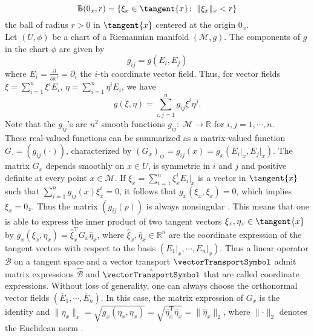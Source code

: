 \begin{equation*}
    \mathbb{B}(0_x, r) = \{ \xi_x \in \tangent{x} \colon \; \lVert \xi_x \rVert_x < r \}
\end{equation*}
the ball of radius $r > 0$ in $\tangent{x}$ centered at the origin $0_x$. \\
Let $(U, \phi)$ be a chart of a Riemannian manifold $(\mathcal{M},g)$. The components of $g$ in the chart $\phi$ are given by
\begin{equation*}
    g_{ij} = g(E_i, E_j)
\end{equation*}
where $E_i = \frac{\partial}{\partial x^i}= \partial_i$ the $i$-th coordinate vector field. Thus, for vector fields $\xi = \sum^{n}_{i=1} \xi^i E_i$, $\eta = \sum^{n}_{i=1} \eta^i E_i$, we have 
\begin{equation*}
    g(\xi, \eta) = \sum^{n}_{i, j=1} g_{ij} \xi^i \eta^j.
\end{equation*}
Note that the $g_{ij}$'s are $n^2$ smooth functions $g_{ij} \colon \; \mathcal{M} \to \mathbb{R}$ for $i,j = 1, \cdots, n$. \\
These real-valued functions can be summarized as a matrix-valued function $G_{\cdot} = (g_{ij}(\cdot))$, characterized by $(G_x)_{ij} = g_{ij} (x) = g_x(E_i \vert_x, E_j \vert_x)$. The matrix $G_x$ depends smoothly on $x \in U$, is symmetric in $i$ and $j$ and positive definite at every point $x \in \mathcal{M}$. If $\xi_x = \sum^{n}_{i = 1} \xi^{i}_x E_i \vert_x$ is a vector in $\tangent{x}$ such that $\sum^{n}_{i = 1} g_{ij} (x) \xi^{i}_x = 0$, it follows that $g_x(\xi_x, \xi_x) = 0$, which implies $\xi_x = 0_x$. Thus the matrix $(g_{ij} (p))$ is always nonsingular \cite[p.~13]{Lee:2019}. This means that one is able to express the inner product of two tangent vectors $\xi_x, \eta_x \in \tangent{x}$ by $g_x (\xi_x, \eta_x) = \hat{\xi}^{\mathrm{T}}_x G_x \hat{\eta}_x$, where $\hat{\xi}_x, \hat{\eta}_x \in \mathbb{R}^n$ are the coordinate expression of the tangent vectors with respect to the basis $(E_1 \vert_x, \cdots, E_n \vert_x)$. Thus a linear operator $\mathcal{B}$ on a tangent space and a vector transport $\vectorTransportSymbol$ admit matrix expressions $\hat{\mathcal{B}}$ and $\hat{\vectorTransportSymbol}$ that are called coordinate expressions. Without loss of generality, one can always choose the orthonormal vector fields $(\overline{E}_1, \cdots, \overline{E}_n)$. In this case, the matrix expression of $G_x$ is the identity and $\lVert \eta_x \rVert_x = \sqrt{g_x(\eta_x, \eta_x)} = \sqrt{\hat{\eta}^{\mathrm{T}}_x \hat{\eta}_x} = \lVert \hat{\eta}_x \rVert_2$, where $\lVert \cdot \rVert_2$ denotes the Euclidean norm \cite[p.~11]{Huang:2013}. \\ 
